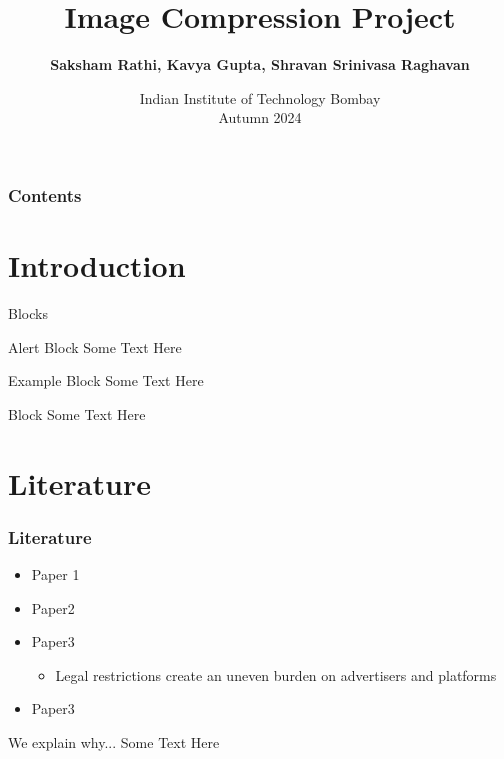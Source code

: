\documentclass[Serif, 10pt, brown]{beamer}
\title[{Image Compression}]{\sc Image Compression Project}
\author[\ul{Authors}]{{\bf Saksham Rathi, Kavya Gupta, Shravan Srinivasa Raghavan}}
\institute[UTD]{\sc\small CS663: Digital Image Processing\\ Under Prof. Ajit Rajwade}
\date[UCI]{Indian Institute of Technology Bombay \\ Autumn 2024}
\theoremstyle{example}
\theoremstyle{plain}
\begin{document}
\frame{\titlepage}
%
%


\begin{frame}
	\transblindsvertical
	\frametitle{Contents}
	\tableofcontents[hidesubsections]
\end{frame}


\section[Introduction]{Introduction}

\begin{frame}{Blocks}
    \begin{alertblock}{Alert Block}
        Some Text Here 
    \end{alertblock}
    \begin{exampleblock} {Example Block}
        Some Text Here
    \end{exampleblock}
    \begin{block}{ Block}
        Some Text Here
    \end{block}
\end{frame}



\section[Literature]{Literature}
\begin{frame}
	\frametitle{Literature}
	\transfly
	\begin{itemize}
		\item Paper 1 ~\citep{Corbett18,Kochling20,Silva19}
		\item Paper2~\citep{Cowgill20}
		\pause
		\item Paper3~\citep{Lambrecht19}
		\begin{itemize}
			\item Legal restrictions create an uneven burden on advertisers and platforms~\citep{Yuan23}
		\end{itemize}
		\pause
		\item Paper3~\citep{Fu22}
	\end{itemize}
	\pause
	\begin{exampleblock}{We explain why...}
		Some Text Here 
	\end{exampleblock}
\end{frame}
\end{document}
